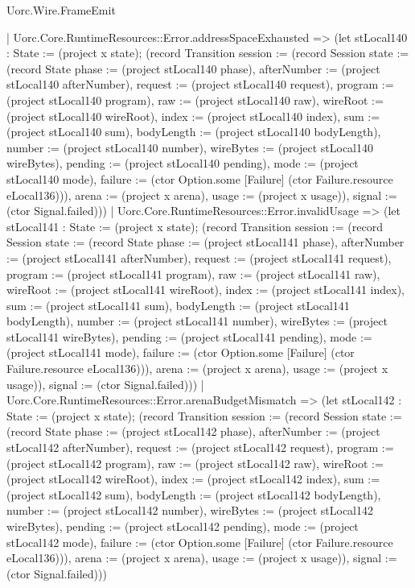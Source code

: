 \begin{lexlean}{Uorc.Wire.FrameEmit}
\begin{semanticmodule}
{      | Uorc.Core.RuntimeResources::Error.addressSpaceExhausted => (let stLocal140 : State := (project x state); (record Transition {session := (record Session {state := (record State {phase := (project stLocal140 phase), afterNumber := (project stLocal140 afterNumber), request := (project stLocal140 request), program := (project stLocal140 program), raw := (project stLocal140 raw), wireRoot := (project stLocal140 wireRoot), index := (project stLocal140 index), sum := (project stLocal140 sum), bodyLength := (project stLocal140 bodyLength), number := (project stLocal140 number), wireBytes := (project stLocal140 wireBytes), pending := (project stLocal140 pending), mode := (project stLocal140 mode), failure := (ctor Option.some [Failure] (ctor Failure.resource eLocal136))}), arena := (project x arena), usage := (project x usage)}), signal := (ctor Signal.failed)}))
      | Uorc.Core.RuntimeResources::Error.invalidUsage => (let stLocal141 : State := (project x state); (record Transition {session := (record Session {state := (record State {phase := (project stLocal141 phase), afterNumber := (project stLocal141 afterNumber), request := (project stLocal141 request), program := (project stLocal141 program), raw := (project stLocal141 raw), wireRoot := (project stLocal141 wireRoot), index := (project stLocal141 index), sum := (project stLocal141 sum), bodyLength := (project stLocal141 bodyLength), number := (project stLocal141 number), wireBytes := (project stLocal141 wireBytes), pending := (project stLocal141 pending), mode := (project stLocal141 mode), failure := (ctor Option.some [Failure] (ctor Failure.resource eLocal136))}), arena := (project x arena), usage := (project x usage)}), signal := (ctor Signal.failed)}))
      | Uorc.Core.RuntimeResources::Error.arenaBudgetMismatch => (let stLocal142 : State := (project x state); (record Transition {session := (record Session {state := (record State {phase := (project stLocal142 phase), afterNumber := (project stLocal142 afterNumber), request := (project stLocal142 request), program := (project stLocal142 program), raw := (project stLocal142 raw), wireRoot := (project stLocal142 wireRoot), index := (project stLocal142 index), sum := (project stLocal142 sum), bodyLength := (project stLocal142 bodyLength), number := (project stLocal142 number), wireBytes := (project stLocal142 wireBytes), pending := (project stLocal142 pending), mode := (project stLocal142 mode), failure := (ctor Option.some [Failure] (ctor Failure.resource eLocal136))}), arena := (project x arena), usage := (project x usage)}), signal := (ctor Signal.failed)}))
}
\end{semanticmodule}
\end{lexlean}
